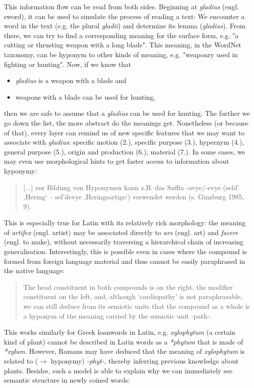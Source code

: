 \documentclass[jou]{apa6} %
\begin{document}
This information flow can be read from both sides. Beginning at \textit{gladius} (engl. sword), it can be used to simulate the process of reading a text: We encounter a word in the text (e.g. the plural \textit{gladii}) and determine its lemma (\textit{gladius}). From there, we can try to find a corresponding meaning for the surface form, e.g. "a cutting or thrusting weapon with a long blade". This meaning, in the WordNet taxonomy, can be hyponym to other kinds of meaning, e.g. "weaponry used in fighting or hunting". Now, if we know that
\begin{itemize}
         \item \textit{gladius} is a weapon with a blade and
         \item weapons with a blade can be used for hunting,
\end{itemize}
then we are safe to assume that a \textit{gladius} can be used for hunting. The further we go down the list, the more abstract do the meanings get. Nonetheless (or because of that), every layer can remind us of new specific features that we may want to associate with \textit{gladius}: specific motion (2.), specific purpose (3.), hypernym (4.), general purpose (5.), origin and production (6.), material (7.). In some cases, we may even use morphological hints to get faster access to information about hyponymy:
\blockquote[{\cite[p.~913]{anstattTypenSemantischerRelationen2009}}]{[...] zur Bildung von Hyponymen kann z.B. das Suffix -ovye/-evye (seld’ ‚Hering‘ – sel’devye ‚Heringsartige‘) verwendet werden (s. Ginzburg 1985, 9).}
This is especially true for Latin with its relatively rich morphology: the meaning of \textit{artifex} (engl. artist) may be associated directly to \textit{ars} (engl. art) and \textit{facere} (engl. to make), without necessarily traversing a hierarchical chain of increasing generalisation. Interestingly, this is possible even in cases where the compound is formed from foreign language material and thus cannot be easily paraphrased in the native language:
\blockquote[{\cite[p.~33]{souille-rigautSemanticAccountQuasiLexemes2010}}]{The head constituent in both compounds is on the right, the modifier constituent on the left, and, although ‘cardiopathy’ is not paraphrasable, we can still deduce from its semiotic units that the compound as a whole is a hyponym of the meaning carried by the semiotic unit -path-.}
This works similarly for Greek loanwords in Latin, e.g. \textit{xylophytum} (a certain kind of plant) cannot be described in Latin words as a \textit{*phytum} that is made of \textit{*xylum}. However, Romans may have deduced that the meaning of \textit{xylophytum} is related to ($\rightarrow$ hyponymy) \textit{-phyt-}, thereby inferring previous knowledge about plants. Besides, such a model is able to explain why we can immediately see semantic structure in newly coined words:
\end{document}
